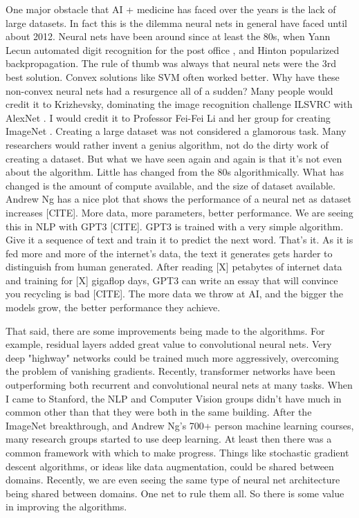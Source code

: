 One major obstacle that AI + medicine has faced over the years is the lack of large datasets.  In fact this is the dilemma neural nets in general have faced until about 2012.  Neural nets have been around since at least the 80s, when Yann Lecun automated digit recognition for the post office \cite{lecun1989backpropagation}, and Hinton popularized backpropagation.  The rule of thumb was always that neural nets were the 3rd best solution.  Convex solutions like SVM often worked better.  Why have these non-convex neural nets had a resurgence all of a sudden?  Many people would credit it to Krizhevsky, dominating the image recognition challenge ILSVRC with AlexNet \cite{krizhevsky2012imagenet}.  I would credit it to Professor Fei-Fei Li and her group for creating ImageNet \cite{deng2009imagenet}.  Creating a large dataset was not considered a glamorous task.  Many researchers would rather invent a genius algorithm, not do the dirty work of creating a dataset.  But what we have seen again and again is that it's not even about the algorithm.  Little has changed from the 80s algorithmically.  What has changed is the amount of compute available, and the size of dataset available.  Andrew Ng has a nice plot that shows the performance of a neural net as dataset increases [CITE].  More data, more parameters, better performance.  We are seeing this in NLP with GPT3 [CITE].  GPT3 is trained with a very simple algorithm.  Give it a sequence of text and train it to predict the next word.  That's it.  As it is fed more and more of the internet's data, the text it generates gets harder to distinguish from human generated.  After reading [X] petabytes of internet data and training for [X] gigaflop days, GPT3 can write an essay that will convince you recycling is bad [CITE].  The more data we throw at AI, and the bigger the models grow, the better performance they achieve.

That said, there are some improvements being made to the algorithms.  For example, residual layers added great value to convolutional neural nets.  Very deep "highway" networks could be trained much more aggressively, overcoming the problem of vanishing gradients.  Recently, transformer networks have been outperforming both recurrent and convolutional neural nets at many tasks.  When I came to Stanford, the NLP and Computer Vision groups didn't have much in common other than that they were both in the same building.  After the ImageNet breakthrough, and Andrew Ng's 700+ person machine learning courses, many research groups started to use deep learning.  At least then there was a common framework with which to make progress.  Things like stochastic gradient descent algorithms, or ideas like data augmentation, could be shared between domains.  Recently, we are even seeing the same type of neural net architecture being shared between domains.  One net to rule them all.  So there is some value in improving the algorithms.  

